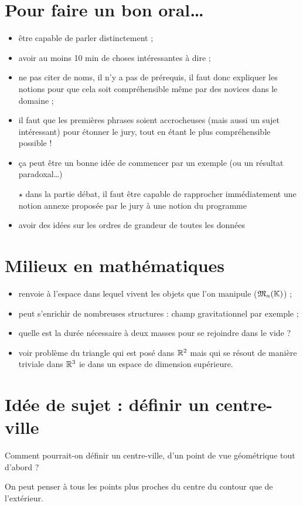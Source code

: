 \documentclass[a4paper, 12pt]{article}
\begin{document}


    \section{Pour faire un bon oral\ldots}

    \begin{itemize}
        \item être capable de parler distinctement ;
        \item avoir au moins 10 min de choses intéressantes à dire ;
        \item ne pas citer de noms, il n'y a pas de prérequis, il faut donc expliquer les notions pour que cela soit compréhensible même par des novices dans le domaine ;
        \item il faut que les premières phrases soient accrocheuses (mais aussi un sujet intéressant) pour étonner le jury, tout en étant le plus compréhensible possible !
        \item ça peut être un bonne idée de commencer par un exemple (ou un résultat paradoxal\ldots)
        \item[$\star$] dans la partie débat, il faut être capable de rapprocher immédiatement une notion annexe proposée par le jury à une notion du programme
        \item avoir des idées sur les ordres de grandeur de toutes les données
    \end{itemize}

    \section{Milieux en mathématiques}

    \begin{itemize}
        \item renvoie à l'espace dans lequel vivent les objets que l'on manipule ($\mathfrak{M}_n(\mathbb{K})$) ;
        \item peut s'enrichir de nombreuses structures : champ gravitationnel par exemple ;
        \item quelle est la durée nécessaire à deux masses pour se rejoindre dans le vide ?
        \item voir problème du triangle qui est posé dans $\mathbb{R}^2$ mais qui se résout de manière triviale dans $\mathbb{R}^3$ ie dans un espace de dimension supérieure.
    \end{itemize}

    \section{Idée de sujet : définir un centre-ville}

    Comment pourrait-on définir un centre-ville, d'un point de vue géométrique tout d'abord ?

    On peut penser à tous les points plus proches du centre du contour que de l'extérieur.
\end{document}
